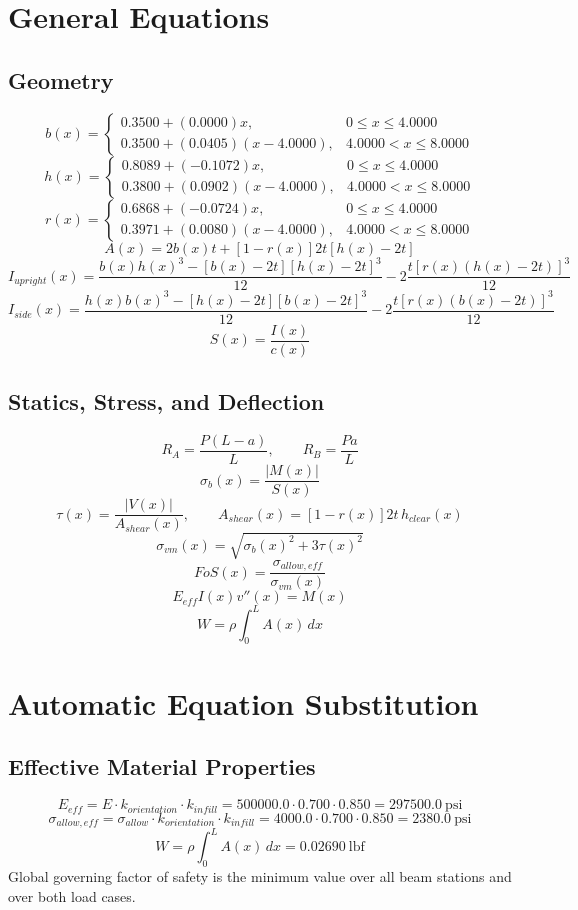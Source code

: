 \documentclass[11pt]{article}
\begin{document}
\section*{General Equations}
\subsection*{Geometry}
\[
b(x)=\begin{cases}0.3500 + (0.0000)x, & 0 \le x \le 4.0000\\0.3500 + (0.0405)(x-4.0000), & 4.0000 < x \le 8.0000\end{cases}
\]
\[
h(x)=\begin{cases}0.8089 + (-0.1072)x, & 0 \le x \le 4.0000\\0.3800 + (0.0902)(x-4.0000), & 4.0000 < x \le 8.0000\end{cases}
\]
\[
r(x)=\begin{cases}0.6868 + (-0.0724)x, & 0 \le x \le 4.0000\\0.3971 + (0.0080)(x-4.0000), & 4.0000 < x \le 8.0000\end{cases}
\]
\[
A(x)=2b(x)t+[1-r(x)]2t[h(x)-2t]
\]
\[
I_{upright}(x)=\frac{b(x)h(x)^3-[b(x)-2t][h(x)-2t]^3}{12}-2\frac{t[r(x)(h(x)-2t)]^3}{12}
\]
\[
I_{side}(x)=\frac{h(x)b(x)^3-[h(x)-2t][b(x)-2t]^3}{12}-2\frac{t[r(x)(b(x)-2t)]^3}{12}
\]
\[
S(x)=\frac{I(x)}{c(x)}
\]

\subsection*{Statics, Stress, and Deflection}
\[
R_A=\frac{P(L-a)}{L}, \qquad R_B=\frac{Pa}{L}
\]
\[
\sigma_b(x)=\frac{|M(x)|}{S(x)}
\]
\[
\tau(x)=\frac{|V(x)|}{A_{shear}(x)}, \qquad A_{shear}(x)=[1-r(x)]2t\,h_{clear}(x)
\]
\[
\sigma_{vm}(x)=\sqrt{\sigma_b(x)^2+3\tau(x)^2}
\]
\[
FoS(x)=\frac{\sigma_{allow,eff}}{\sigma_{vm}(x)}
\]
\[
E_{eff}I(x)v''(x)=M(x)
\]
\[
W=\rho\int_0^L A(x)\,dx
\]

\section*{Automatic Equation Substitution}
\subsection*{Effective Material Properties}
\[E_{eff} = E \cdot k_{orientation} \cdot k_{infill} = 500000.0 \cdot 0.700 \cdot 0.850 = 297500.0\ \mathrm{psi}\]
\[\sigma_{allow,eff} = \sigma_{allow} \cdot k_{orientation} \cdot k_{infill} = 4000.0 \cdot 0.700 \cdot 0.850 = 2380.0\ \mathrm{psi}\]
\[W = \rho \int_0^L A(x)\,dx = 0.02690\ \mathrm{lbf}\]
Global governing factor of safety is the minimum value over all beam stations and over both load cases.
\end{document}
